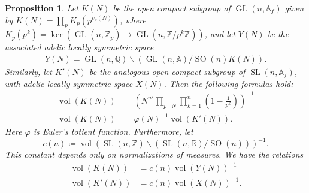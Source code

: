 \documentclass[11pt,reqno]{amsart}
\numberwithin{equation}{section}
\newtheorem{prop}[thm]{Proposition}
\theoremstyle{definition}
\theoremstyle{remark}
\newcommand{\Q}{\mathbb{Q}}
\newcommand{\GL}{\operatorname{GL}}
\newcommand{\SL}{\operatorname{SL}}
\newcommand{\SO}{\operatorname{SO}}
\newcommand{\vol}{\operatorname{vol}}
\renewcommand{\ker}{\operatorname{ker}}
\newcommand{\A}{\mathbb{A}}
\newcommand{\Z}{\mathbb{Z}}
\newcommand{\R}{\mathbb{R}}
\renewcommand{\phi}{\varphi}
\begin{document}
\begin{prop}
    Let $K(N)$ be the open compact subgroup of $\GL(n,\A_f)$ given by $K(N) = \prod_p K_p(p^{v_p(N)})$, where $K_p(p^k)=\ker(\GL(n,\Z_p)\to \GL(n,\Z/p^k\Z))$, and let $Y(N)$ be the associated adelic locally symmetric space
    \begin{align*}
        Y(N) = \GL(n,\Q)\backslash (\GL(n,\A)/\SO(n)K(N)).
    \end{align*} 
    Similarly, let $K'(N)$ be the analogous open compact subgroup of $\SL(n,\A_f)$, with adelic locally symmetric space $X(N)$. Then the following formulas hold:
    \begin{align}
        \label{volformula}\vol(K(N)) &= \left(N^{n^2}\prod_{p\mid N}\prod_{k=1}^{n}\left(1-\frac{1}{p^k}\right)\right)^{-1}\\
        \label{relatevol}\vol(K(N)) &= \phi(N)^{-1}\vol(K'(N)).
    \end{align}
    Here $\phi$ is Euler's totient function. Furthermore, let
    $$c(n)\coloneqq \vol(\SL(n,\Z)\backslash(\SL(n,\R)/\SO(n)))^{-1}.$$
    This constant depends only on normalizations of measures. We have the relations
    \begin{align}
        \label{GLnspacevol}\vol(K(N)) &= c(n) \vol(Y(N))^{-1}\\
        \label{SLnspacevol}\vol(K'(N)) &= c(n) \vol(X(N))^{-1}.
    \end{align}
\end{prop}
\end{document}
